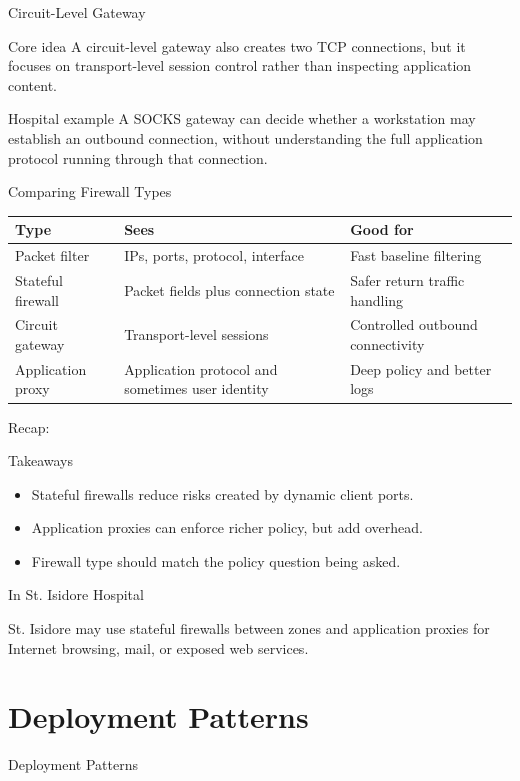 \documentclass[presentation]{beamer}
\newcommand{\sectiontitleframe}[1]{
\begin{frame}[plain,c]
\begin{center}
{\usebeamerfont{title}\usebeamercolor[fg]{title}#1}
\end{center}
\end{frame}
}
\newcommand{\scenario}{St. Isidore Hospital}
\newcommand{\takeawaysframe}[2]{
\begin{frame}[c]{Recap: \insertsection}
\begin{block}{Takeaways}
#1
\end{block}
\begin{exampleblock}{In \scenario}
#2
\end{exampleblock}
\end{frame}
}
\begin{document}
\begin{frame}[c]{Circuit-Level Gateway}
\begin{block}{Core idea}
A circuit-level gateway also creates two TCP connections, but it focuses on transport-level session
control rather than inspecting application content.
\end{block}

\begin{exampleblock}{Hospital example}
A SOCKS gateway can decide whether a workstation may establish an outbound connection, without
understanding the full application protocol running through that connection.
\end{exampleblock}
\end{frame}

\begin{frame}[c]{Comparing Firewall Types}
\small
\begin{tabularx}{\textwidth}{@{}p{}p{}X@{}}
\toprule
\textbf{Type} & \textbf{Sees} & \textbf{Good for} \\
\midrule
Packet filter & IPs, ports, protocol, interface & Fast baseline filtering \\
Stateful firewall & Packet fields plus connection state & Safer return traffic handling \\
Circuit gateway & Transport-level sessions & Controlled outbound connectivity \\
Application proxy & Application protocol and sometimes user identity & Deep policy and better logs \\
\bottomrule
\end{tabularx}
\end{frame}

\takeawaysframe{
\begin{itemize}
    \item Stateful firewalls reduce risks created by dynamic client ports.
    \item Application proxies can enforce richer policy, but add overhead.
    \item Firewall type should match the policy question being asked.
\end{itemize}
}{
St. Isidore may use stateful firewalls between zones and application proxies for Internet browsing,
mail, or exposed web services.
}

\section{Deployment Patterns}
\sectiontitleframe{Deployment Patterns}
\end{document}
